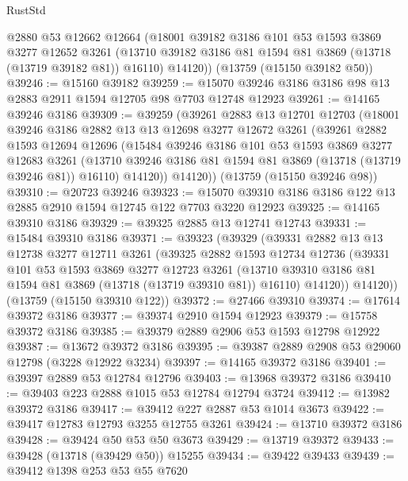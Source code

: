 \begin{lexlean}{RustStd}
\begin{coremodule}
      @2880
      @53
      @12662
      @12664
      (@18001
        @39182
        @3186
        @101
        @53
        @1593
        @3869
        @3277
        @12652
        @3261
        (@13710 @39182 @3186 @81 @1594 @81 @3869 (@13718 (@13719 @39182 @81)) @16110)
        @14120))
    (@13759 (@15150 @39182 @50))
@39246 := @15160 @39182
@39259 := @15070 @39246 @3186 @3186 @98 @13 @2883 @2911 @1594 @12705 @98 @7703 @12748 @12923
@39261 := @14165 @39246 @3186
@39309 := @39259
    (@39261
      @2883
      @13
      @12701
      @12703
      (@18001
        @39246
        @3186
        @2882
        @13
        @13
        @12698
        @3277
        @12672
        @3261
        (@39261
          @2882
          @1593
          @12694
          @12696
          (@15484
            @39246
            @3186
            @101
            @53
            @1593
            @3869
            @3277
            @12683
            @3261
            (@13710 @39246 @3186 @81 @1594 @81 @3869 (@13718 (@13719 @39246 @81)) @16110)
            @14120))
        @14120))
    (@13759 (@15150 @39246 @98))
@39310 := @20723 @39246
@39323 := @15070 @39310 @3186 @3186 @122 @13 @2885 @2910 @1594 @12745 @122 @7703 @3220 @12923
@39325 := @14165 @39310 @3186
@39329 := @39325 @2885 @13 @12741 @12743
@39331 := @15484 @39310 @3186
@39371 := @39323
    (@39329
      (@39331
        @2882
        @13
        @13
        @12738
        @3277
        @12711
        @3261
        (@39325
          @2882
          @1593
          @12734
          @12736
          (@39331
            @101
            @53
            @1593
            @3869
            @3277
            @12723
            @3261
            (@13710 @39310 @3186 @81 @1594 @81 @3869 (@13718 (@13719 @39310 @81)) @16110)
            @14120))
        @14120))
    (@13759 (@15150 @39310 @122))
@39372 := @27466 @39310
@39374 := @17614 @39372 @3186
@39377 := @39374 @2910 @1594 @12923
@39379 := @15758 @39372 @3186
@39385 := @39379 @2889 @2906 @53 @1593 @12798 @12922
@39387 := @13672 @39372 @3186
@39395 := @39387 @2889 @2908 @53 @29060 @12798 (@3228 @12922 @3234)
@39397 := @14165 @39372 @3186
@39401 := @39397 @2889 @53 @12784 @12796
@39403 := @13968 @39372 @3186
@39410 := @39403 @223 @2888 @1015 @53 @12784 @12794 @3724
@39412 := @13982 @39372 @3186
@39417 := @39412 @227 @2887 @53 @1014 @3673
@39422 := @39417 @12783 @12793 @3255 @12755 @3261
@39424 := @13710 @39372 @3186
@39428 := @39424 @50 @53 @50 @3673
@39429 := @13719 @39372
@39433 := @39428 (@13718 (@39429 @50)) @15255
@39434 := @39422 @39433
@39439 := @39412 @1398 @253 @53 @55 @7620

\end{coremodule}
\end{lexlean}

